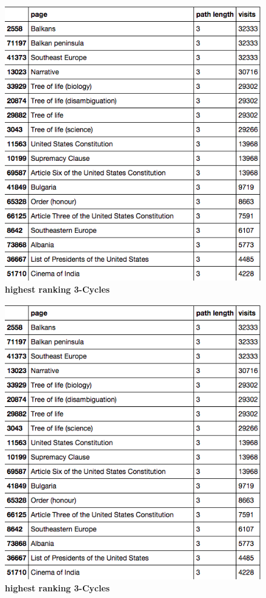 \documentclass[pre,twocolumn,twoside,superscriptaddress,floatfix, aps, 10pt]{revtex4-1}
\begin{document}
\begin{figure}[tp!]
  \centering	
  \includegraphics[width=\columnwidth]{graphics/top_3loops.png}
  \caption{
    \textbf{highest ranking 3-Cycles}
  }
  \label{fig:Highest Ranking 3-Cyles}
\end{figure}

\begin{figure}[tp!]
  \centering	
  \includegraphics[width=\columnwidth]{graphics/top_3loops.png}
  \caption{
    \textbf{highest ranking 3-Cycles}
  }
  \label{fig:Highest Ranking 3-Cyles}
\end{figure}
\end{document}
